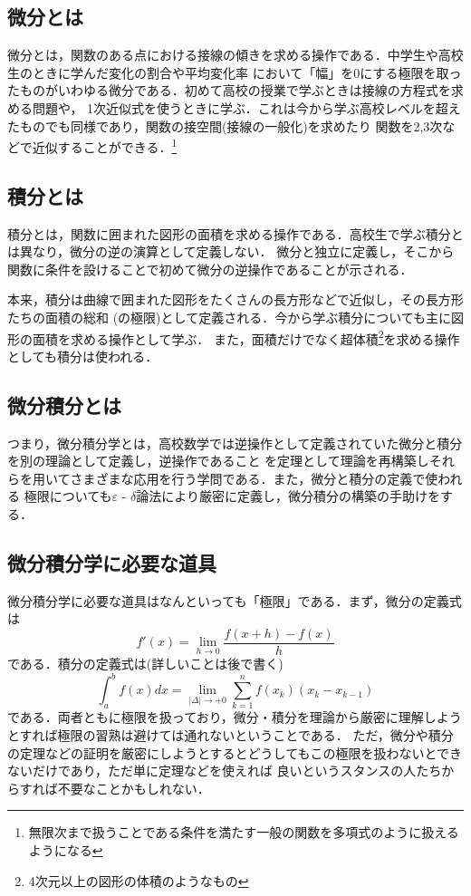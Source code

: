 \documentclass[a4paper,12pt,autodetect-engine,dvipdfmx]{jsarticle}
\theoremstyle{definition}
\begin{document}
\subsection{微分とは}
微分とは，関数のある点における接線の傾きを求める操作である．中学生や高校生のときに学んだ変化の割合や平均変化率
において「幅」を0にする極限を取ったものがいわゆる微分である．初めて高校の授業で学ぶときは接線の方程式を求める問題や，
1次近似式を使うときに学ぶ．これは今から学ぶ高校レベルを超えたものでも同様であり，関数の接空間(接線の一般化)を求めたり
関数を2,3次などで近似することができる．\footnote{無限次まで扱うことである条件を満たす一般の関数を多項式のように扱えるようになる}

\subsection{積分とは}
積分とは，関数に囲まれた図形の面積を求める操作である．高校生で学ぶ積分とは異なり，微分の逆の演算として定義しない．
微分と独立に定義し，そこから関数に条件を設けることで初めて微分の逆操作であることが示される．

本来，積分は曲線で囲まれた図形をたくさんの長方形などで近似し，その長方形たちの面積の総和
(の極限)として定義される．今から学ぶ積分についても主に図形の面積を求める操作として学ぶ．
また，面積だけでなく超体積\footnote{4次元以上の図形の体積のようなもの}を求める操作としても積分は使われる．
\subsection{微分積分とは}
つまり，微分積分学とは，高校数学では逆操作として定義されていた微分と積分を別の理論として定義し，逆操作であること
を定理として理論を再構築しそれらを用いてさまざまな応用を行う学問である．また，微分と積分の定義で使われる
極限についても$\varepsilon$ - $\delta$論法により厳密に定義し，微分積分の構築の手助けをする．

\subsection{微分積分学に必要な道具}
微分積分学に必要な道具はなんといっても「極限」である．まず，微分の定義式は
\begin{equation*}
    f'(x) = \lim_{h \to 0}\dfrac{f(x + h) - f(x)}{h}
\end{equation*}
である．積分の定義式は(詳しいことは後で書く)
\begin{equation*}
    \displaystyle \int_{a}^{b}f(x)dx = \lim_{|\Delta| \to +0}\sum_{k = 1}^{n}f(x_{k})(x_{k} - x_{k-1})
\end{equation*}
である．両者ともに極限を扱っており，微分・積分を理論から厳密に理解しようとすれば極限の習熟は避けては通れないということである．
ただ，微分や積分の定理などの証明を厳密にしようとするとどうしてもこの極限を扱わないとできないだけであり，ただ単に定理などを使えれば
良いというスタンスの人たちからすれば不要なことかもしれない．
\end{document}
